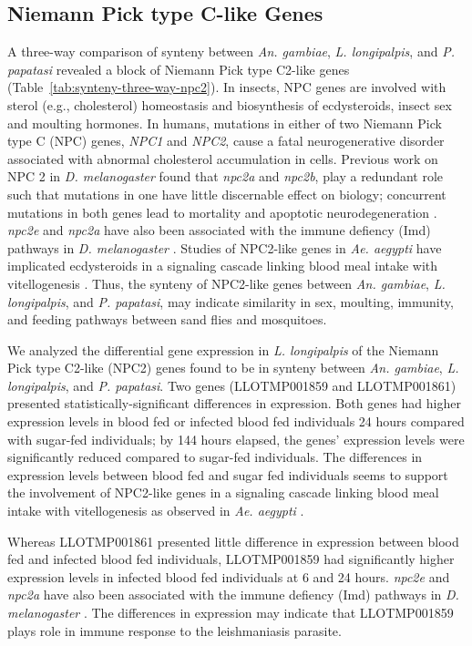 \subsection{Niemann Pick type C-like Genes}
A three-way comparison of synteny between \emph{An. gambiae}, \emph{L. longipalpis}, and \emph{P. papatasi} revealed a block of Niemann Pick type C2-like genes (Table~\ref{tab:synteny-three-way-npc2}). In insects, NPC genes are involved with sterol (e.g., cholesterol) homeostasis and biosynthesis of ecdysteroids, insect sex and moulting hormones. In humans, mutations in either of two Niemann Pick type C (NPC) genes, \emph{NPC1} and \emph{NPC2}, cause a fatal neurogenerative disorder associated with abnormal cholesterol accumulation in cells.  Previous work on NPC 2 in \emph{D. melanogaster} found that \emph{npc2a} and \emph{npc2b}, play a redundant role such that mutations in one have little discernable effect on biology; concurrent mutations in both genes lead to mortality and apoptotic neurodegeneration \cite{Huang2007}.  \emph{npc2e} and \emph{npc2a} have also been associated with the immune defiency (Imd) pathways in \emph{D. melanogaster} \cite{Shi2012}. Studies of NPC2-like genes in \emph{Ae. aegypti} have implicated ecdysteroids in a signaling cascade linking blood meal intake with vitellogenesis \cite{Sirot2011}.  Thus, the synteny of NPC2-like genes between \emph{An. gambiae}, \emph{L. longipalpis}, and \emph{P. papatasi}, may indicate similarity in sex, moulting, immunity, and feeding pathways between sand flies and mosquitoes.

We analyzed the differential gene expression in \emph{L. longipalpis} of the Niemann Pick type C2-like (NPC2) genes found to be in synteny between \emph{An. gambiae}, \emph{L. longipalpis}, and \emph{P. papatasi}.  Two genes (LLOTMP001859 and LLOTMP001861) presented statistically-significant differences in expression. Both genes had higher expression levels in blood fed or infected blood fed individuals 24 hours compared with sugar-fed individuals; by 144 hours elapsed, the genes' expression levels were significantly reduced compared to sugar-fed individuals.  The differences in expression levels between blood fed and sugar fed individuals seems to support the involvement of NPC2-like genes in a signaling cascade linking blood meal intake with vitellogenesis as observed in \emph{Ae. aegypti} \cite{Sirot2011}.

Whereas LLOTMP001861 presented little difference in expression between blood fed and infected blood fed individuals, LLOTMP001859 had significantly higher expression levels in infected blood fed individuals at 6 and 24 hours.  \emph{npc2e} and \emph{npc2a} have also been associated with the immune defiency (Imd) pathways in \emph{D. melanogaster} \cite{Shi2012}.  The differences in expression may indicate that LLOTMP001859 plays role in immune response to the leishmaniasis parasite.


